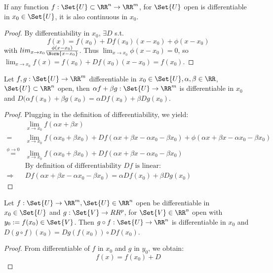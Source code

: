 \begin{prop}
  If any function $f:\Set{U}\subset\RR^n\to\RR^m$, for $\Set{U}$ open is differentiable in $x_0\in\Set{U}$, it is also continuous in $x_0$. 
\end{prop}
\begin{proof}
  By differentiability in $x_0$, $\exists D$ s.t. $$f(x)=f(x_0)+Df(x_0)(x-x_0)+\phi(x-x_0)$$ with $lim_{x\to x_0}\frac{\phi(x-x_0)}{\Norm{x-x_0}}$. Thus $\lim_{x\to x_0}\phi(x-x_0)=0$, so $\lim_{x\to x_0}f(x)=f(x_0)+Df(x_0)(x-x_0)=f(x_0)$.
\end{proof}


\begin{prop}[linearity]
  Let $f, g:\Set{U}\to \RR^m$ differentiable in $x_0\in \Set{U}, \alpha, \beta\in\RR$, $\Set{U}\subset\RR^n$ open, then $\alpha f+\beta g:\Set{U}\to\RR^m$ is differentiable in $x_0$ and $D(\alpha f(x_0)+\beta g(x_0)=\alpha Df(x_0)+\beta D g(x_0)$.
\end{prop}
\begin{proof}
  Plugging in the definition of differentiability, we yield:
  \begin{align*}
  	&\lim_{x\to x_0}f(\alpha x+\beta x)\\
  	=&\lim_{x\to x_0}f(\alpha x_0+\beta x_0)+Df(\alpha x+\beta x-\alpha x_0-\beta x_0)+\phi(\alpha x+\beta x-\alpha x_0-\beta x_0)\\\overset{\phi\to 0}{=}&\lim_{x\to x_0}f(\alpha x_0+\beta x_0)+Df(\alpha x+\beta x-\alpha x_0-\beta x_0)\\&\text{By definition of differentiability $Df$ is linear:}\\
  	\Rightarrow& Df(\alpha x+\beta x-\alpha x_0-\beta x_0)=\alpha Df(x_0)+\beta D g(x_0)
  \end{align*}
\end{proof}


\begin{thm}
  Let $f:\Set{U}\to\RR^m, \Set{U}\in\RR^n$ open be differentiable in $x_0\in \Set{U}$ and $g:\Set{V}\to RR^p$, for $\Set{V}\in \RR^n$ open with $y_0:=f(x_0)\in \Set{V}$. Then $g\circ f: \Set{U}\to \RR^n$ is differentiable in $x_0$ and $D(g\circ f)(x_0)=Dg(f(x_0))\circ Df(x_0)$.
\end{thm}
\begin{proof}
  From differentiable of $f$ in $x_0$ and $g$ in $y_0$, we obtain: 
  \begin{equation}
  	\label{eqn:1}
  	f(x)=f(x_0)+D
  \end{equation}
\end{proof}